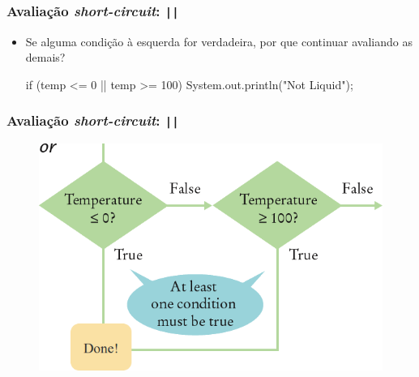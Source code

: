 \documentclass[xcolor={dvipsnames,table},aspectratio=169]{beamer}
\begin{document}
\begin{frame}[fragile]\frametitle{Avaliação \emph{short-circuit}: \texttt{||}}
\begin{itemize}
	\item Se alguma condição à esquerda for verdadeira, por que continuar avaliando as demais?
\begin{javacode}
if (temp <= 0 || temp >= 100) {
  System.out.println("Not Liquid"); 
}
\end{javacode}
\end{itemize}
\end{frame}

\begin{frame}\frametitle{Avaliação \emph{short-circuit}: \texttt{||}}
\begin{figure}[h]
	\includegraphics[height=0.70\paperheight,center]{pucrs-ep-fprog-unidade_03-decisoes-laminas-short_or.png}
\end{figure}
\end{frame}
\end{document}
